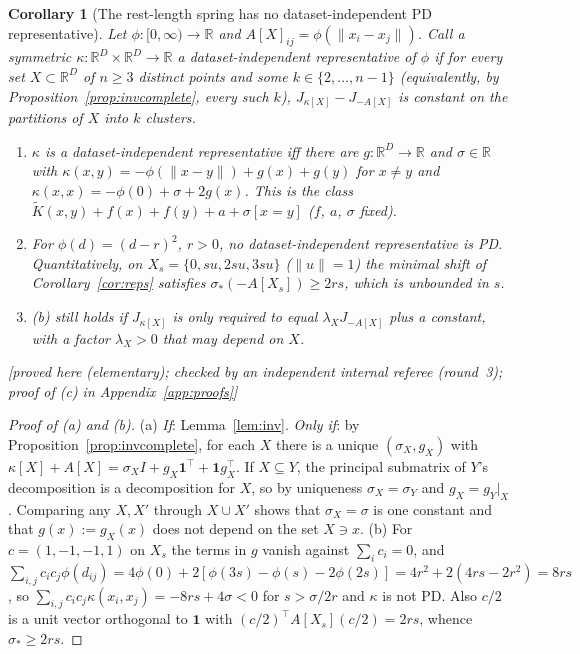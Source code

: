 \documentclass[11pt,a4paper]{article}
\theoremstyle{plain}
\newtheorem{corollary}[theorem]{Corollary}
\theoremstyle{definition}
\theoremstyle{remark}
\newcommand{\R}{\mathbb{R}}
\newcommand{\one}{\mathbf 1}
\newcommand{\status}[1]{\textsf{\small [#1]}}
\newcommand{\rthree}{checked by an independent internal referee (round~3)}
\begin{document}
\begin{corollary}[The rest-length spring has no dataset-independent PD representative]\label{cor:rest}
Let $\phi\colon[0,\infty)\to\R$ and $A[X]_{ij}=\phi(\lVert x_i-x_j\rVert)$. Call a symmetric $\kappa\colon\R^D\times\R^D\to\R$ a \emph{dataset-independent representative} of $\phi$ if for every set $X\subset\R^D$ of $n\ge3$ distinct points and some $k\in\{2,\dots,n-1\}$ (equivalently, by Proposition~\ref{prop:invcomplete}, every such $k$), $J_{\kappa[X]}-J_{-A[X]}$ is constant on the partitions of $X$ into $k$ clusters.
\begin{enumerate}[label=(\alph*),leftmargin=2em]
\item $\kappa$ is a dataset-independent representative iff there are $g\colon\R^D\to\R$ and $\sigma\in\R$ with $\kappa(x,y)=-\phi(\lVert x-y\rVert)+g(x)+g(y)$ for $x\ne y$ and $\kappa(x,x)=-\phi(0)+\sigma+2g(x)$. This is the class $\widetilde K(x,y)+f(x)+f(y)+a+\sigma[x=y]$ ($f$, $a$, $\sigma$ fixed).
\item For $\phi(d)=(d-r)^2$, $r>0$, no dataset-independent representative is PD. Quantitatively, on $X_s=\{0,su,2su,3su\}$ ($\lVert u\rVert=1$) the minimal shift of Corollary~\ref{cor:reps} satisfies $\sigma_*(-A[X_s])\ge2rs$, which is unbounded in $s$.
\item (b) still holds if $J_{\kappa[X]}$ is only required to equal $\lambda_XJ_{-A[X]}$ plus a constant, with a factor $\lambda_X>0$ that may depend on $X$.
\end{enumerate}
\status{proved here (elementary); \rthree; proof of (c) in Appendix~\ref{app:proofs}}
\end{corollary}
\begin{proof}[Proof of (a) and (b)]
(a) \emph{If}: Lemma~\ref{lem:inv}. \emph{Only if}: by Proposition~\ref{prop:invcomplete}, for each $X$ there is a unique $(\sigma_X,g_X)$ with $\kappa[X]+A[X]=\sigma_XI+g_X\one^{\!\top}+\one g_X^{\!\top}$. If $X\subseteq Y$, the principal submatrix of $Y$'s decomposition is a decomposition for $X$, so by uniqueness $\sigma_X=\sigma_Y$ and $g_X=g_Y|_X$. Comparing any $X,X'$ through $X\cup X'$ shows that $\sigma_X=\sigma$ is one constant and that $g(x):=g_X(x)$ does not depend on the set $X\ni x$. (b) For $c=(1,-1,-1,1)$ on $X_s$ the terms in $g$ vanish against $\sum_ic_i=0$, and $\sum_{i,j}c_ic_j\phi(d_{ij})=4\phi(0)+2[\phi(3s)-\phi(s)-2\phi(2s)]=4r^2+2(4rs-2r^2)=8rs$, so $\sum_{i,j}c_ic_j\kappa(x_i,x_j)=-8rs+4\sigma<0$ for $s>\sigma/2r$ and $\kappa$ is not PD. Also $c/2$ is a unit vector orthogonal to $\one$ with $(c/2)^{\!\top}A[X_s](c/2)=2rs$, whence $\sigma_*\ge2rs$.
\end{proof}
\end{document}
